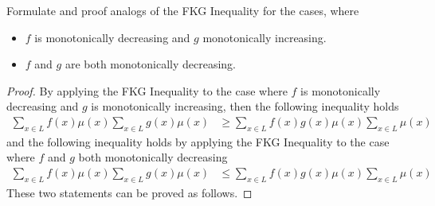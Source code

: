 \begin{problem}
  Formulate and proof analogs of the FKG Inequality for the cases, where
  \begin{itemize}
    \item $f$ is monotonically decreasing and $g$ monotonically increasing.
    \item $f$ and $g$ are both monotonically decreasing.
  \end{itemize}
\end{problem}
\begin{proof}
  By applying the FKG Inequality to the case where $f$ is monotonically decreasing and $g$ is monotonically increasing, then the following inequality holds
  \begin{align*}
    \sum\limits_{x \in L}f(x)\mu(x) \sum\limits_{x \in L}g(x)\mu(x) &\geq \sum\limits_{x \in L}f(x)g(x)\mu(x) \sum\limits_{x \in L} \mu(x)
  \end{align*}
  and the following inequality holds by applying the FKG Inequality to the case where $f$ and $g$ both monotonically decreasing
  \begin{align*}
    \sum\limits_{x \in L}f(x)\mu(x) \sum\limits_{x \in L}g(x)\mu(x) &\leq \sum\limits_{x \in L}f(x)g(x)\mu(x) \sum\limits_{x \in L} \mu(x)
  \end{align*}
  These two statements can be proved as follows.


\end{proof}
